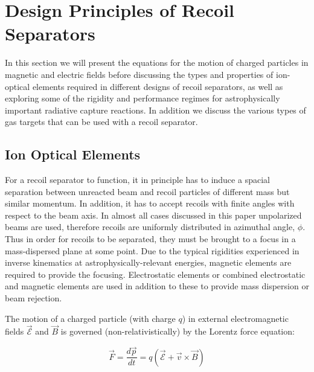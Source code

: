 \section{Design Principles of Recoil Separators}
\label{design}

In this section we will present the equations for the motion of charged particles in magnetic and electric fields before discussing the types and properties of ion-optical elements required in different designs of recoil separators, as well as exploring some of the rigidity and performance regimes for astrophysically important radiative capture reactions. In addition we discuss the various types of gas targets that can be used with a recoil separator.

\subsection{Ion Optical Elements}
\label{ion}

For a recoil separator to function, it in principle has to induce a spacial separation between unreacted beam and recoil particles of different mass but similar momentum. In addition, it has to accept recoils with finite angles with respect to the beam axis. In almost all cases discussed in this paper unpolarized beams are used, therefore recoils are uniformly distributed in azimuthal angle, $\phi$. 
Thus in order for recoils to be separated, they must be brought to a focus in a mass-dispersed plane at some point. Due to the typical rigidities experienced in inverse kinematics at astrophysically-relevant energies, magnetic elements are required to provide the focusing. Electrostatic elements or combined electrostatic and magnetic elements are used in addition to these to provide mass dispersion or beam rejection.  

The motion of a charged particle (with charge $q$) in external electromagnetic fields $\vec{\mathcal{E}}$ and $\vec{B}$  is governed (non-relativistically) by the Lorentz force equation:

\begin{equation}
\vec{F}=\frac{d\vec{p}}{dt}=q(\vec{\mathcal{E}}+\vec{v}\times\vec{B})
\end{equation}   

